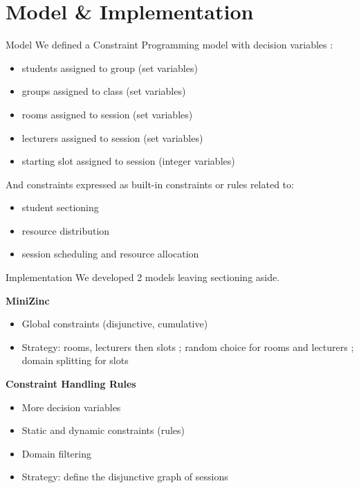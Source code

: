 \documentclass{beamer}
\begin{document}
\section{Model \& Implementation}
\begin{frame}{Model}
    We defined a Constraint Programming model with decision variables :
    \begin{itemize}
        \item students assigned to group (set variables)
        \item groups assigned to class (set variables)
        \item rooms assigned to session (set variables)
        \item lecturers assigned to session (set variables)
        \item starting slot assigned to session (integer variables)
    \end{itemize}
    And constraints expressed as built-in constraints or \UTP{} rules related to:
    \begin{itemize}
        \item student sectioning
        \item resource distribution
        \item session scheduling and resource allocation
    \end{itemize}
\end{frame}

\begin{frame}{Implementation}
    We developed 2 models leaving sectioning aside.
    
    \vfill
    
    \begin{minipage}[t]{.48\textwidth}
    \textbf{MiniZinc}
    \begin{itemize}
        \item Global constraints (disjunctive, cumulative)
        \item Strategy: rooms, lecturers then slots ; random choice for rooms and lecturers ; domain splitting for slots
    \end{itemize}
    \end{minipage}
    \hfill
    \begin{minipage}[t]{.48\textwidth}
    \textbf{Constraint Handling Rules}
    \begin{itemize}
        \item More decision variables
        \item Static and dynamic constraints (rules)
        \item Domain filtering
        \item Strategy: define the disjunctive graph of sessions
    \end{itemize}
    \end{minipage}
\end{frame}
\end{document}
